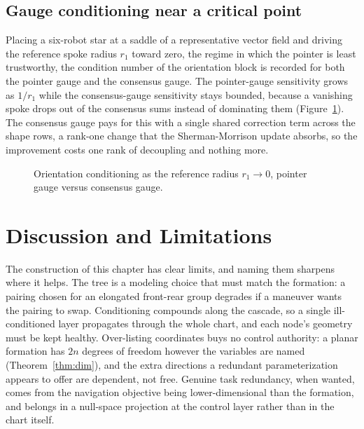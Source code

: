 \documentclass[12pt, letterpaper, oneside]{report}
\begin{document}
\subsection{Gauge conditioning near a critical point}

Placing a six-robot star at a saddle of a representative vector field and
driving the reference spoke radius $r_1$ toward zero, the regime in which
the pointer is least trustworthy, the condition number of the orientation
block is recorded for both the pointer gauge and the consensus gauge. The
pointer-gauge sensitivity grows as $1/r_1$ while the consensus-gauge
sensitivity stays bounded, because a vanishing spoke drops out of the
consensus sums instead of dominating them (Figure~\ref{fig:gauge}). The
consensus gauge pays for this with a single shared correction term across
the shape rows, a rank-one change that the Sherman-Morrison update absorbs,
so the improvement costs one rank of decoupling and nothing more.

\begin{figure}[t]
\centering
\framebox[0.9\linewidth]{\rule{0pt}{3.0cm}}
\caption{Orientation conditioning as the reference radius $r_1 \to 0$,
pointer gauge versus consensus gauge.}
\label{fig:gauge}
\end{figure}

\section{Discussion and Limitations}
\label{sec:cb_discussion}

The construction of this chapter has clear limits, and naming them
sharpens where it helps. The tree is a modeling choice that must match the
formation: a pairing chosen for an elongated front-rear group degrades if a
maneuver wants the pairing to swap. Conditioning compounds along the
cascade, so a single ill-conditioned layer propagates through the whole
chart, and each node's geometry must be kept healthy. Over-listing
coordinates buys no control authority: a planar formation has $2n$ degrees
of freedom however the variables are named (Theorem~\ref{thm:dim}), and the
extra directions a redundant parameterization appears to offer are
dependent, not free. Genuine task redundancy, when wanted, comes from the
navigation objective being lower-dimensional than the formation, and belongs
in a null-space projection at the control layer rather than in the chart
itself.
\end{document}
